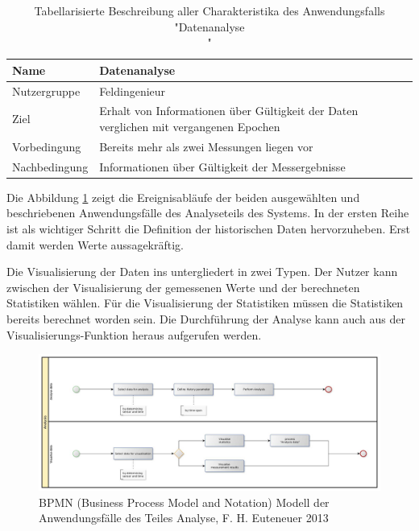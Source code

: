 \begin{table}[H]
\centering
\begin{tabular}{l | p{11cm}}
Name & Datenanalyse\\ \hline 
Nutzergruppe & Feldingenieur\\ \hline 
Ziel & Erhalt von Informationen über Gültigkeit der Daten verglichen mit vergangenen Epochen\\ \hline 
Vorbedingung & Bereits mehr als zwei Messungen liegen vor\\ \hline 
Nachbedingung & Informationen über Gültigkeit der Messergebnisse\\ 
\end{tabular}
\caption{Tabellarisierte Beschreibung aller Charakteristika des Anwendungsfalls "Datenanalyse\\"} 
\label{table:use case description of "Analyse data"}
\end{table}

Die Abbildung \ref{fig:bpmn_use-case_analysis} zeigt die Ereignisabläufe der beiden ausgewählten und beschriebenen Anwendungsfälle des Analyseteils des Systems. In der ersten Reihe ist als wichtiger Schritt die Definition der historischen Daten hervorzuheben. Erst damit werden Werte aussagekräftig.

Die Visualisierung der Daten ins untergliedert in zwei Typen. Der Nutzer kann zwischen der Visualisierung der gemessenen Werte und der berechneten Statistiken wählen. Für die Visualisierung der Statistiken müssen die Statistiken bereits berechnet worden sein. Die Durchführung der Analyse kann auch aus der Visualisierungs-Funktion heraus aufgerufen werden.

\begin{figure}[H]
	\centering
 	 \includegraphics[scale=0.24]{graphics/bpmn_use-cases_analysis.jpg} 
	\caption{BPMN (Business Process Model and Notation) Modell der Anwendungsfälle des Teiles Analyse, F. H. Euteneuer 2013}
	 \label{fig:bpmn_use-case_analysis}
\end{figure}


